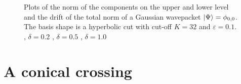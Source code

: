 \begin{figure}
{  } \\
   \\
  \caption[Plots of the norms and drifts for a simple avoided crossing]{
    Plots of the norm of the components on the upper and lower level and the drift of the total norm
    of a Gaussian wavepacket $\Ket{\Psi} = \phi_{0,0}$. The basis shape is a hyperbolic cut with cut-off $K = 32$
    and $\varepsilon = 0.1$.
    ,  $\delta = 0.2$
    ,  $\delta = 0.5$
    ,  $\delta = 1.0$
    \label{fig:conic_avoided_32_norms_eps_01_part1}
  }
\end{figure}


\FloatBarrier
\section{A conical crossing}

